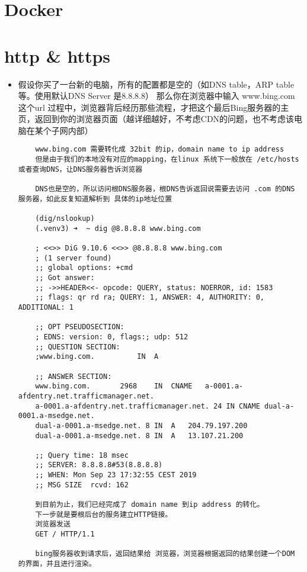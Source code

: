 \documentclass[11pt]{article}
\author{Zongxiong Chen}
\date{\today}
\title{}
\begin{document}
\tableofcontents

\section{Docker}
\label{sec:org5790306}
\section{http \& https}
\label{sec:org6b5fce9}
\begin{itemize}
\item 假设你买了一台新的电脑，所有的配置都是空的（如DNS table，ARP table 等。使用默认DNS Server 是8.8.8.8）
那么你在浏览器中输入 www.bing.com 这个url 过程中，浏览器背后经历那些流程，才把这个最后Bing服务器的主页，返回到你的浏览器页面（越详细越好，不考虑CDN的问题，也不考虑该电脑在某个子网内部）
\begin{verbatim}
    www.bing.com 需要转化成 32bit 的ip，domain name to ip address
    但是由于我们的本地没有对应的mapping，在linux 系统下一般放在 /etc/hosts或者查询DNS，让DNS服务器告诉浏览器

    DNS也是空的，所以访问根DNS服务器，根DNS告诉返回说需要去访问 .com 的DNS 服务器，如此反复知道解析到 具体的ip地址位置

    (dig/nslookup)
    (.venv3) ➜  ~ dig @8.8.8.8 www.bing.com

    ; <<>> DiG 9.10.6 <<>> @8.8.8.8 www.bing.com
    ; (1 server found)
    ;; global options: +cmd
    ;; Got answer:
    ;; ->>HEADER<<- opcode: QUERY, status: NOERROR, id: 1583
    ;; flags: qr rd ra; QUERY: 1, ANSWER: 4, AUTHORITY: 0, ADDITIONAL: 1

    ;; OPT PSEUDOSECTION:
    ; EDNS: version: 0, flags:; udp: 512
    ;; QUESTION SECTION:
    ;www.bing.com.			IN	A

    ;; ANSWER SECTION:
    www.bing.com.		2968	IN	CNAME	a-0001.a-afdentry.net.trafficmanager.net.
    a-0001.a-afdentry.net.trafficmanager.net. 24 IN	CNAME dual-a-0001.a-msedge.net.
    dual-a-0001.a-msedge.net. 8	IN	A	204.79.197.200
    dual-a-0001.a-msedge.net. 8	IN	A	13.107.21.200

    ;; Query time: 18 msec
    ;; SERVER: 8.8.8.8#53(8.8.8.8)
    ;; WHEN: Mon Sep 23 17:32:55 CEST 2019
    ;; MSG SIZE  rcvd: 162

    到目前为止，我们已经完成了 domain name 到ip address 的转化。
    下一步就是要根后台的服务建立HTTP链接。
    浏览器发送
    GET / HTTP/1.1

    bing服务器收到请求后，返回结果给 浏览器，浏览器根据返回的结果创建一个DOM 的界面，并且进行渲染。


\end{verbatim}
\end{itemize}
\end{document}
